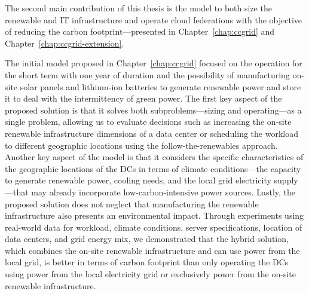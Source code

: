 The second main contribution of this thesis is the model to both size the renewable and IT infrastructure and operate cloud federations with the objective of reducing the carbon footprint---presented in Chapter~\ref{chap:ccgrid} and Chapter~\ref{chap:ccgrid-extension}. 

The initial model proposed in Chapter~\ref{chap:ccgrid} focused on the operation for the short term with one year of duration and the possibility of manufacturing on-site solar panels and lithium-ion batteries to generate renewable power and store it to deal with the intermittency of green power. The first key aspect of the proposed solution is that it solves both subproblems---sizing and operating---as a single problem, allowing us to evaluate decisions such as increasing the on-site renewable infrastructure dimensions of a data center or scheduling the workload to different geographic locations using the follow-the-renewables approach. Another key aspect of the model is that it considers the specific characteristics of the geographic locations of the DCs in terms of climate conditions---the capacity to generate renewable power, cooling needs, and the local grid electricity supply---that may already incorporate low-carbon-intensive power sources. Lastly, the proposed solution does not neglect that manufacturing the renewable infrastructure also presents an environmental impact. Through experiments using real-world data for workload, climate conditions, server specifications, location of data centers, and grid energy mix,  we demonstrated that the hybrid solution, which combines the on-site renewable infrastructure and can use power from the local grid, is better in terms of carbon footprint than only operating the DCs using power from the local electricity grid or exclusively power from the on-site renewable infrastructure.

